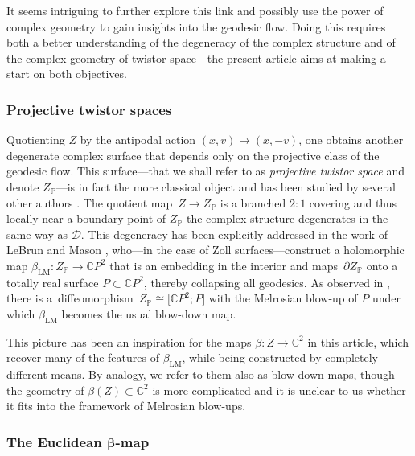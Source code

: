 \documentclass[10pt,a4paper]{amsart}
\numberwithin{equation}{section}
\theoremstyle{definition}
\newcommand{\C}{\mathbb{C}} %
\newcommand{\1}{{\bf 1}}
\newcommand{\D}{\mathscr{D}}
\begin{document}
 It seems intriguing to further explore this link and possibly
use the power of complex geometry to gain insights into the geodesic flow. Doing this requires both a better understanding of the degeneracy of the complex structure and of the complex geometry of twistor space---the present article aims at making a start on both objectives.


\subsubsection{Projective twistor spaces} Quotienting $Z$ by the antipodal action $(x,v)\mapsto (x,-v)$, one obtains another degenerate complex surface that depends only on the projective class of the geodesic flow. This surface---that we shall refer to as {\it projective twistor space} and denote $Z_\mathbb P$---is in fact the more classical object and has been studied by several other authors \cite{Dub83,Hit80,Leb80,LeMa02,LM10,Met21,MePa20,OR85}. The quotient map~${Z\rightarrow Z_\mathbb P}$
is a branched $2:1$ covering and thus locally near a boundary point of $Z_\mathbb P$ the complex structure degenerates in the same way as $\D$. This degeneracy has been explicitly addressed in the work of LeBrun and Mason \cite{LeMa02,LM10}, who---in the case of Zoll surfaces---construct a holomorphic map $\beta_{\mathrm{LM}}\colon Z_\mathbb P\rightarrow \C P^2$ that is an embedding in the interior and maps~$\partial Z_\mathbb P$ onto a totally real surface $P\subset\C P^2$, thereby collapsing all geodesics. As observed in \cite{Roc11}, there is a~diffeomorphism~${Z_\mathbb P \cong \big[\C P^2;P\big]}$ with the Melrosian blow-up of $P$ under which $\beta_{\mathrm{LM}}$ becomes the usual blow-down map.

This picture has been an inspiration for the maps $\beta\colon Z\to \C^2$ in this article, which recover many of the features of $\beta_{\mathrm{LM}}$, while being constructed by completely different means. By analogy, we refer to them also as blow-down maps, though the geometry of $\beta(Z)\subset \C^2$ is more complicated and it is unclear to us whether it fits into the framework of Melrosian blow-ups.

\subsubsection[The Euclidean beta-map]{The Euclidean $\boldsymbol{\beta}$-map}\label{sec_Eucl}
\end{document}

